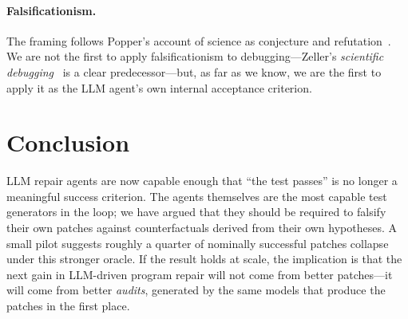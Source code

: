 \documentclass[sigconf,review,anonymous,nonacm]{acmart}
\begin{document}
\paragraph{Falsificationism.} The framing follows Popper's account of
science as conjecture and refutation~\cite{popper1959logic}. We are
not the first to apply falsificationism to debugging---Zeller's
\emph{scientific debugging}~\cite{zeller2009why} is a clear
predecessor---but, as far as we know, we are the first to apply it as
the LLM agent's own internal acceptance criterion.

\section{Conclusion}
\label{sec:conclusion}

LLM repair agents are now capable enough that ``the test passes'' is
no longer a meaningful success criterion. The agents themselves are
the most capable test generators in the loop; we have argued that they
should be required to falsify their own patches against
counterfactuals derived from their own hypotheses. A small pilot
suggests roughly a quarter of nominally successful patches collapse
under this stronger oracle. If the result holds at scale, the
implication is that the next gain in LLM-driven program repair will
not come from better patches---it will come from better
\emph{audits}, generated by the same models that produce the patches
in the first place.

\balance



\end{document}
